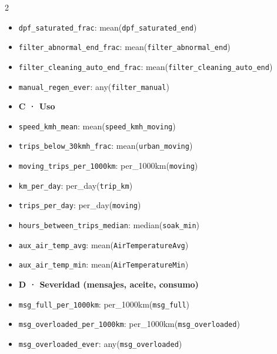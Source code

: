 \begin{multicols}{2}
\begin{itemize}[leftmargin=0pt,itemsep=0pt,label={}]
\item[] \texttt{dpf\_\allowbreak{}saturated\_\allowbreak{}frac}: mean(\texttt{dpf\_\allowbreak{}saturated\_\allowbreak{}end})
\item[] \texttt{filter\_\allowbreak{}abnormal\_\allowbreak{}end\_\allowbreak{}frac}: mean(\texttt{filter\_\allowbreak{}abnormal\_\allowbreak{}end})
\item[] \texttt{filter\_\allowbreak{}cleaning\_\allowbreak{}auto\_\allowbreak{}end\_\allowbreak{}frac}: mean(\texttt{filter\_\allowbreak{}cleaning\_\allowbreak{}auto\_\allowbreak{}end})
\item[] \texttt{manual\_\allowbreak{}regen\_\allowbreak{}ever}: any(\texttt{filter\_\allowbreak{}manual})
\item[] \textbf{C · Uso}
\item[] \texttt{speed\_\allowbreak{}kmh\_\allowbreak{}mean}: mean(\texttt{speed\_\allowbreak{}kmh\_\allowbreak{}moving})
\item[] \texttt{trips\_\allowbreak{}below\_\allowbreak{}30kmh\_\allowbreak{}frac}: mean(\texttt{urban\_\allowbreak{}moving})
\item[] \texttt{moving\_\allowbreak{}trips\_\allowbreak{}per\_\allowbreak{}1000km}: per\_\allowbreak{}1000km(\texttt{moving})
\item[] \texttt{km\_\allowbreak{}per\_\allowbreak{}day}: per\_\allowbreak{}day(\texttt{trip\_\allowbreak{}km})
\item[] \texttt{trips\_\allowbreak{}per\_\allowbreak{}day}: per\_\allowbreak{}day(\texttt{moving})
\item[] \texttt{hours\_\allowbreak{}between\_\allowbreak{}trips\_\allowbreak{}median}: median(\texttt{soak\_\allowbreak{}min})
\item[] \texttt{aux\_air\_\allowbreak{}temp\_\allowbreak{}avg}: mean(\texttt{AirTemperatureAvg})
\item[] \texttt{aux\_air\_\allowbreak{}temp\_\allowbreak{}min}: mean(\texttt{AirTemperatureMin})
\item[] \textbf{D · Severidad (mensajes, aceite, consumo)}
\item[] \texttt{msg\_\allowbreak{}full\_\allowbreak{}per\_\allowbreak{}1000km}: per\_\allowbreak{}1000km(\texttt{msg\_\allowbreak{}full})
\item[] \texttt{msg\_\allowbreak{}overloaded\_\allowbreak{}per\_\allowbreak{}1000km}: per\_\allowbreak{}1000km(\texttt{msg\_\allowbreak{}overloaded})
\item[] \texttt{msg\_\allowbreak{}overloaded\_\allowbreak{}ever}: any(\texttt{msg\_\allowbreak{}overloaded})

\end{itemize}
\end{multicols}
